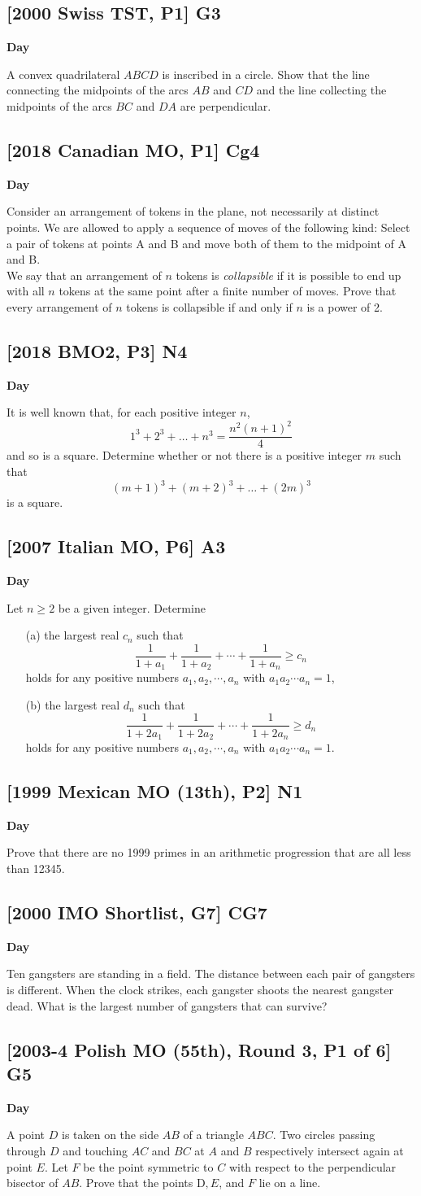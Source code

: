 \documentclass[10pt]{article}
\newcommand{\themonth}{March}
\newcommand{\theyear}{2019}
\newcounter{day}
\newcounter{solution}
\newcounter{datenumber}
\newcommand{\problem}[4][0]{
	\newpage
	\subsection{[#3] \space #2} \hfill 
	{\large\textbf{Day \arabic{day}}} %
	\begin{flushleft} #4 \end{flushleft}
	\vspace{1em}
	\addtocounter{day}{1}
	\addtocounter{datenumber}{1}
	\setcounter{solution}{1}
}
\begin{document}
\problem[111]{G3}{2000 Swiss TST, P1}{A convex quadrilateral \(ABCD\) is inscribed in a circle. Show that the line connecting the midpoints of the arcs \(AB\) and \(CD\) and the line collecting the midpoints of the arcs \(BC\) and \(DA\) are perpendicular.}

\problem[112]{Cg4}{2018 Canadian MO, P1}{Consider an arrangement of tokens in the plane, not necessarily at distinct points. We are allowed to apply a sequence of moves of the following kind: Select a pair of tokens at points A and B and move both of them to the midpoint of A and B.\\
	We say that an arrangement of \(n\) tokens is \textit{collapsible} if it is possible to end up with all \(n\) tokens at the same point after a finite number of moves. Prove that every arrangement of \(n\) tokens is collapsible if and only if \(n\) is a power of 2.}

\problem[113]{N4}{2018 BMO2, P3}{It is well known that, for each positive integer \(n\),
	\[1^3 + 2^3 + \dots + n^3 = \frac{n^2(n+1)^2}{4}\]
	and so is a square. Determine whether or not there is a positive integer \(m\) such that
	\[(m+1)^3 + (m+2)^3 + \dots + (2m)^3\]
	is a square.}

\problem[114]{A3}{2007 Italian MO, P6}{Let \(n \geq 2\) be a given integer. Determine
	\begin{enumerate}
		\item[(a)] the largest real \(c_n\) such that \[\frac{1}{1+a_1} + \frac{1}{1+a_2} + \cdots + \frac{1}{1+a_n} \geq c_n\] holds for any positive numbers \(a_1, a_2, \cdots, a_n\) with \(a_1a_2\cdots a_n = 1\),
		\item[(b)] the largest real \(d_n\) such that \[\frac{1}{1+2a_1} + \frac{1}{1+2a_2} + \cdots + \frac{1}{1+2a_n} \geq d_n\] holds for any positive numbers  \(a_1, a_2, \cdots, a_n\) with \(a_1a_2\cdots a_n = 1\).
	\end{enumerate}}

\problem[115]{N1}{1999 Mexican MO (13th), P2}{Prove that there are no 1999 primes in an arithmetic progression that are all less than 12345.}

\problem[116]{CG7}{2000 IMO Shortlist, G7}{Ten gangsters are standing in a field. The distance between each pair of gangsters is different. When the clock strikes, each gangster shoots the nearest gangster dead. What is the largest number of gangsters that can survive?}

\problem[117]{G5}{2003-4 Polish MO (55th), Round 3, P1 of 6}{A point \(D\) is taken on the side \(AB\) of a triangle \(ABC\). Two circles passing through \(D\) and touching \(AC\) and \(BC\) at \(A\) and \(B\) respectively intersect again at point \(E\). Let \(F\) be the point symmetric to \(C\) with respect to the perpendicular bisector of \(AB\). Prove that the points D\(,E\), and \(F\) lie on a line.}
\end{document}
